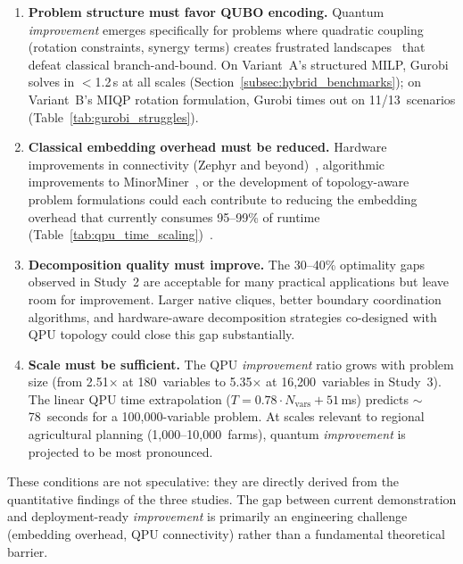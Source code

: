 \begin{enumerate}
    \item \textbf{Problem structure must favor QUBO encoding.} Quantum \textit{improvement} emerges specifically for problems where quadratic coupling (rotation constraints, synergy terms) creates frustrated landscapes~\cite{barahona1982computational, lucasIsingFormulationsMany2014} that defeat classical branch-and-bound. On Variant~A's structured MILP, Gurobi solves in $<$1.2\,s at all scales (Section~\ref{subsec:hybrid_benchmarks}); on Variant~B's MIQP rotation formulation, Gurobi times out on 11/13~scenarios (Table~\ref{tab:gurobi_struggles}).

    \item \textbf{Classical embedding overhead must be reduced.} Hardware improvements in connectivity (Zephyr and beyond)~\cite{boothby2021zephyr}, algorithmic improvements to MinorMiner~\cite{cai2014practical}, or the development of topology-aware problem formulations could each contribute to reducing the embedding overhead that currently consumes 95--99\% of runtime (Table~\ref{tab:qpu_time_scaling})~\cite{zbinden2020embedding}.

    \item \textbf{Decomposition quality must improve.} The 30--40\% optimality gaps observed in Study~2 are acceptable for many practical applications but leave room for improvement. Larger native cliques, better boundary coordination algorithms, and hardware-aware decomposition strategies co-designed with QPU topology could close this gap substantially.

    \item \textbf{Scale must be sufficient.} The QPU \textit{improvement} ratio grows with problem size (from 2.51$\times$ at 180~variables to 5.35$\times$ at 16,200~variables in Study~3). The linear QPU time extrapolation ($T = 0.78 \cdot N_{\text{vars}} + 51$\,ms) predicts $\sim$78~seconds for a 100,000-variable problem. At scales relevant to regional agricultural planning (1,000--10,000~farms), quantum \textit{improvement} is projected to be most pronounced.
\end{enumerate}

These conditions are not speculative: they are directly derived from the quantitative findings of the three studies. The gap between current demonstration and deployment-ready \textit{improvement} is primarily an engineering challenge (embedding overhead, QPU connectivity) rather than a fundamental theoretical barrier.

